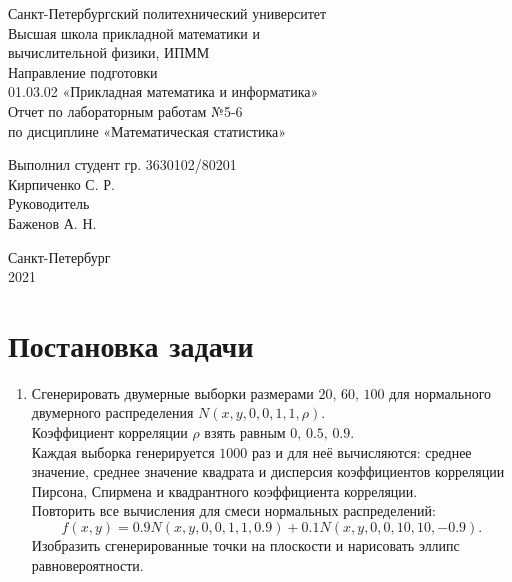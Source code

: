 \documentclass[a4paper,12pt]{article} %
\begin{document}

\large
\begin{center}
    Санкт-Петербургский политехнический университет\\
    Высшая школа прикладной математики и\\вычислительной физики, ИПММ\\
    \vspace{5em}
    Направление подготовки\\
    01.03.02 «Прикладная математика и информатика»\\
    \vspace{3em}
    Отчет по лабораторным работам №5-6\\
    по дисциплине «Математическая статистика»
    \vspace{15em}
\end{center}
Выполнил студент гр. 3630102/80201\\
Кирпиченко С. Р.\\
Руководитель\\
Баженов А. Н.
\vspace{7em}
\begin{center}
    Санкт-Петербург\\
    2021
\end{center}
\thispagestyle{empty}
\newpage
\tableofcontents
{}
\newpage
\listoffigures
{}
\newpage
\listoftables
{}
\thispagestyle{empty}
\newpage
\section{Постановка задачи}
\begin{enumerate}
    \item Сгенерировать двумерные выборки размерами $20,\,60,\,100$ для нормального двумерного распределения $N(x,y,0,0,1,1,\rho)$.\\
    Коэффициент корреляции $\rho$ взять равным $0,\,0.5,\,0.9$.\\
    Каждая выборка генерируется $1000$ раз и для неё вычисляются: среднее значение, среднее значение квадрата и дисперсия коэффициентов корреляции Пирсона, Спирмена и квадрантного коэффициента корреляции.\\
    Повторить все вычисления для смеси нормальных распределений:
    \begin{equation*}
        f(x,y)=0.9N(x,y,0,0,1,1,0.9)+0.1N(x,y,0,0,10,10,-0.9).
    \end{equation*}
    Изобразить сгенерированные точки на плоскости и нарисовать эллипс
    равновероятности.
\end{enumerate}
\end{document}
